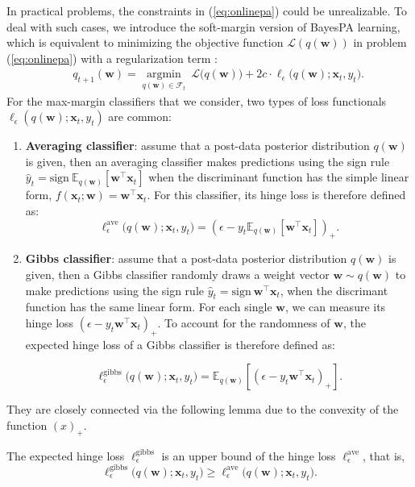 \documentclass[twoside,11pt]{article}
\newcommand{\xv}{\bm{x}}
\newcommand{\wv}{\bm{w}}
\begin{document}
In practical problems, the constraints in (\ref{eq:onlinepa}) could be unrealizable. To deal with such cases, we introduce the soft-margin version of BayesPA learning, which is equivalent to minimizing the objective function $\mathcal{L}(q(\bm{w}))$ in problem (\ref{eq:onlinepa}) with a regularization term \citep{cortes1995support}:
\setlength\arraycolsep{-3pt}\begin{eqnarray}\label{eq:onlinepa_reg}
&&q_{t+1}(\bm{w}) = \underset{q(\bm{w}) \in \mathcal{F}_t}{\operatorname{argmin}} ~\mathcal{L}\Big(q(\bm{w})\Big) + 2c \cdot \ell_\epsilon\Big(q(\bm{w}); \bm{x}_t, y_t\Big).
\end{eqnarray}
%
For the max-margin classifiers that we consider, two types of loss functionals $\ell_\epsilon(q(\bm{w}); \bm{x}_t, y_t)$ are common:
\begin{enumerate}
\item {\bf Averaging classifier}: assume that a post-data posterior distribution $q(\wv)$ is given, then an averaging classifier makes predictions using the sign rule $\hat{y}_t = \textrm{sign} ~ \mathbb{E}_{q(\bm{w})}[\bm{w}^\top \bm{x}_t]$ when the discriminant function has the simple linear form, $f(\xv_t; \wv) = \wv^\top \xv_t$. For this classifier, its hinge loss is therefore defined as:
\setlength\arraycolsep{1pt}\begin{equation*}
\ell_\epsilon^\text{ave}\Big(q(\bm{w}); \bm{x}_t, y_t\Big) = \left(\epsilon-y_t \mathbb{E}_{q(\bm{w})}\left[\bm{w}^\top \bm{x}_t\right]\right)_+ .
\end{equation*}
\item {\bf Gibbs classifier}: assume that a post-data posterior distribution $q(\wv)$ is given, then a Gibbs classifier randomly draws a weight vector $\bm{w} \sim q(\bm{w})$ to make predictions using the sign rule $\hat{y}_t = \textrm{sign}~\bm{w}^\top \bm{x}_t$, when the discrimant function has the same linear form. For each single $\wv$, we can measure its hinge loss $(\epsilon-y_t \bm{w}^\top \bm{x}_t )_+$. To account for the randomness of $\wv$, the expected hinge loss of a Gibbs classifier is therefore defined as:

\begin{equation*}
\ell_\epsilon^{\text{gibbs}}\Big(q(\bm{w}); \bm{x}_t, y_t\Big) = \mathbb{E}_{q(\bm{w})}\left[ \left( \epsilon-y_t \bm{w}^\top \bm{x}_t \right)_+\right].
\end{equation*}
\end{enumerate}
They are closely connected via the following lemma due to the convexity of the function $(x)_+$.
\begin{lemma}\label{lm:loss}
The expected hinge loss $\ell_\epsilon^{\text{gibbs}}$ is an upper bound of the hinge loss $\ell_\epsilon^{\text{ave}}$, that is, $$\ell_\epsilon^{\text{gibbs}}\Big(q(\bm{w}); \bm{x}_t, y_t\Big) \geq \ell_\epsilon^{\text{ave}}\Big(q(\bm{w}); \bm{x}_t, y_t\Big).$$
\end{lemma}
\end{document}
